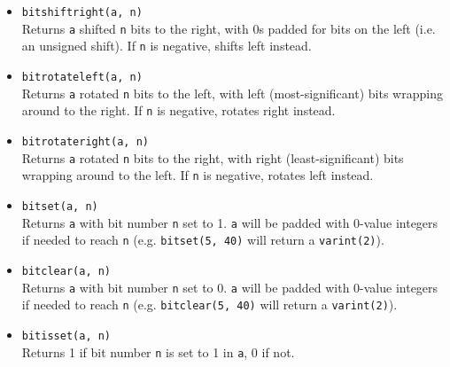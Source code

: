 \begin{itemize}
  \item \verb`bitshiftright(a, n)` \\
    Returns \verb`a` shifted \verb`n` bits to the right, with 0s padded
    for bits on the left (i.e. an unsigned shift).  If \verb`n` is
    negative, shifts left instead.

  \item \verb`bitrotateleft(a, n)` \\
    Returns \verb`a` rotated \verb`n` bits to the left, with left
    (most-significant) bits wrapping around to the right.  If \verb`n`
    is negative, rotates right instead.

  \item \verb`bitrotateright(a, n)` \\
    Returns \verb`a` rotated \verb`n` bits to the right, with right
    (least-significant) bits wrapping around to the left.  If \verb`n`
    is negative, rotates left instead.

  \item \verb`bitset(a, n)` \\
    Returns \verb`a` with bit number \verb`n` set to 1.  \verb`a` will
    be padded with 0-value integers if needed to reach \verb`n` (e.g.
    \verb`bitset(5, 40)` will return a \verb`varint(2)`).

  \item \verb`bitclear(a, n)` \\
    Returns \verb`a` with bit number \verb`n` set to 0.  \verb`a` will
    be padded with 0-value integers if needed to reach \verb`n` (e.g.
    \verb`bitclear(5, 40)` will return a \verb`varint(2)`).

  \item \verb`bitisset(a, n)` \\
    Returns 1 if bit number \verb`n` is set to 1 in \verb`a`, 0 if not.
\end{itemize}

